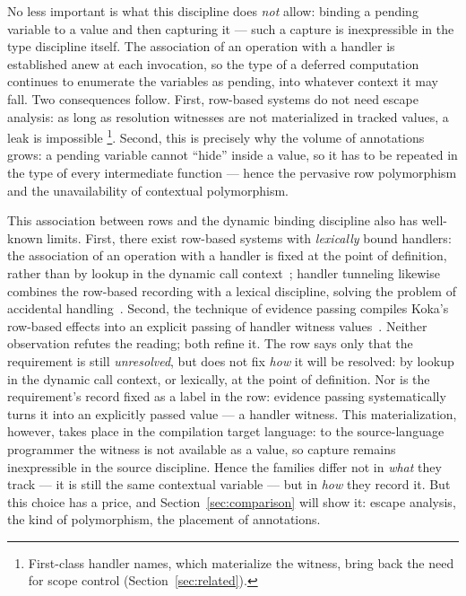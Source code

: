 \documentclass[11pt]{article}
\begin{document}
No less important is what this discipline does \emph{not} allow: binding a pending
variable to a value and then capturing it --- such a capture is inexpressible in the
type discipline itself. The association of an operation with a handler is established
anew at each invocation, so the type of a deferred computation continues to enumerate
the variables as pending, into whatever context it may fall. Two consequences follow.
First, row-based systems do not need escape analysis: as long as resolution witnesses
are not materialized in tracked values, a leak is impossible%
\footnote{First-class handler names, which materialize the witness, bring back the need
for scope control (Section~\ref{sec:related}).}.
Second, this is precisely why the volume of annotations grows: a pending variable
cannot \enquote{hide} inside a value, so it has to be repeated in the type of every
intermediate function --- hence the pervasive row polymorphism and the unavailability
of contextual polymorphism.

This association between rows and the dynamic binding discipline also has well-known limits.
First, there exist row-based systems with \emph{lexically} bound handlers: the
association of an operation with a handler is fixed at the point of definition, rather
than by lookup in the dynamic call context~\cite{biernacki2019binders}; handler
tunneling likewise combines the row-based recording with a lexical discipline, solving
the problem of accidental handling~\cite{zhang2016accepting, zhang2020handling}.
Second, the technique of evidence passing compiles Koka's row-based effects into an
explicit passing of handler witness values~\cite{xie2021generalized}. Neither observation
refutes the reading; both refine it. The row says only that the requirement is
still \emph{unresolved}, but does not fix \emph{how} it will be resolved: by lookup in
the dynamic call context, or lexically, at the point of definition. Nor is the requirement's record fixed as a label in the row: evidence passing
systematically turns it into an explicitly passed value --- a handler witness. This
materialization, however, takes place in the compilation target language: to the
source-language programmer the witness is not available as a value, so capture remains
inexpressible in the source discipline. Hence the families differ not in \emph{what}
they track --- it is still the same contextual variable --- but in \emph{how} they
record it. But this choice has a price, and Section~\ref{sec:comparison} will show it:
escape analysis, the kind of polymorphism, the placement of annotations.
\end{document}
